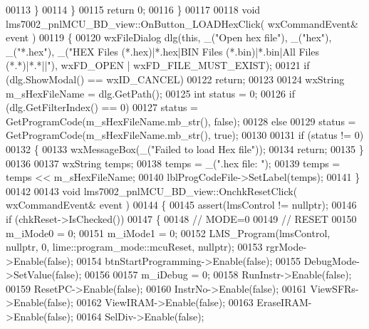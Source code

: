 \begin{DoxyCode}
{00113         \}
00114     \}
00115     \textcolor{keywordflow}{return} 0;
00116 \}
00117 
00118 \textcolor{keywordtype}{void} lms7002_pnlMCU_BD_view::OnButton_LOADHexClick( wxCommandEvent& event )
00119 \{
00120     wxFileDialog dlg(\textcolor{keyword}{this}, \_(\textcolor{stringliteral}{"Open hex file"}), \_(\textcolor{stringliteral}{"hex"}), \_(\textcolor{stringliteral}{"*.hex"}), \_(\textcolor{stringliteral}{"HEX Files (*.hex)|*.hex|BIN Files
       (*.bin)|*.bin|All Files (*.*)|*.*||"}), wxFD\_OPEN | wxFD\_FILE\_MUST\_EXIST);
00121     \textcolor{keywordflow}{if} (dlg.ShowModal() == wxID\_CANCEL)
00122         \textcolor{keywordflow}{return};
00123 
00124     wxString m\_sHexFileName = dlg.GetPath();
00125     \textcolor{keywordtype}{int} status = 0;
00126     \textcolor{keywordflow}{if} (dlg.GetFilterIndex() == 0)
00127         status = GetProgramCode(m\_sHexFileName.mb\_str(), \textcolor{keyword}{false});
00128     \textcolor{keywordflow}{else}
00129         status = GetProgramCode(m\_sHexFileName.mb\_str(), \textcolor{keyword}{true});
00130 
00131     \textcolor{keywordflow}{if} (status != 0)
00132     \{
00133         wxMessageBox(\_(\textcolor{stringliteral}{"Failed to load Hex file"}));
00134         \textcolor{keywordflow}{return};
00135     \}
00136 
00137     wxString temps;
00138     temps = \_(\textcolor{stringliteral}{".hex file: "});
00139     temps = temps << m\_sHexFileName;
00140     lblProgCodeFile->SetLabel(temps);
00141 \}
00142 
00143 \textcolor{keywordtype}{void} lms7002_pnlMCU_BD_view::OnchkResetClick( wxCommandEvent& event )
00144 \{
00145     assert(lmsControl != \textcolor{keyword}{nullptr});
00146     \textcolor{keywordflow}{if} (chkReset->IsChecked())
00147     \{
00148         \textcolor{comment}{// MODE=0}
00149         \textcolor{comment}{// RESET}
00150         m_iMode0 = 0;
00151         m_iMode1 = 0;
00152         LMS_Program(lmsControl, \textcolor{keyword}{nullptr}, 0, lime::program_mode::mcuReset, \textcolor{keyword}{nullptr});
00153         rgrMode->Enable(\textcolor{keyword}{false});
00154         btnStartProgramming->Enable(\textcolor{keyword}{false});
00155         DebugMode->SetValue(\textcolor{keyword}{false});
00156 
00157         m_iDebug = 0;
00158         RunInstr->Enable(\textcolor{keyword}{false});
00159         ResetPC->Enable(\textcolor{keyword}{false});
00160         InstrNo->Enable(\textcolor{keyword}{false});
00161         ViewSFRs->Enable(\textcolor{keyword}{false});
00162         ViewIRAM->Enable(\textcolor{keyword}{false});
00163         EraseIRAM->Enable(\textcolor{keyword}{false});
00164         SelDiv->Enable(\textcolor{keyword}{false});
}
\end{DoxyCode}

